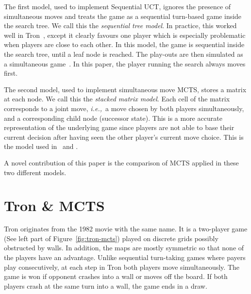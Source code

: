 \documentclass{article}
\newcommand{\ie}{{\it i.e.,}~}
\begin{document}
The first model, used to implement Sequential UCT, ignores the presence of simultaneous moves and treats the game as a sequential turn-based game inside the search tree. 
We call this the {\it sequential tree model}. 
In practice, this worked well in Tron~\cite{tron_cig,teuling_tron}, except it clearly favours one player which is especially problematic when players are close to each other. 
In this model, the game is sequential inside the search tree, until a leaf node is reached. The play-outs are then simulated as a simultaneous game~\cite{teuling_tron}. 
In this paper, the player running the search always moves first. 

The second model, used to implement simultaneous move MCTS, stores a matrix at each node. 
We call this the {\it stacked matrix model}.
Each cell of the matrix corresponds to a joint move, \ie a move chosen by both players simultaneously, and a corresponding child node (successor state). 
This is a more accurate representation of the underlying game since players are not able to base their current decision after having seen the other player's current move choice. 
This is the model used in~\cite{cig_paper} and \cite{mcts_goofspiel}.

A novel contribution of this paper is the comparison of MCTS applied in these two different models. 

\section{Tron \& MCTS}
\label{sec:tron_specific_mcts}

Tron originates from the 1982 movie with the same name. It is a two-player game (See left part of Figure~\ref{fig:tron-mcts}) played on discrete grids possibly obstructed by walls. In addition, the maps are mostly symmetric so that none of the players have an advantage. Unlike sequential turn-taking games where payers play consecutively, at each step in Tron both players move simultaneously. The game is won if opponent crashes into a wall or moves off the board. If both players crash at the same turn into a wall, the game ends in a draw.
\end{document}
